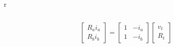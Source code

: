 \documentclass[aspectratio=169]{beamer}
\begin{document}
\begin{frame}[fragile]
\begin{tabular}{r}
\begin{columns}
\begin{column}{0.6\textwidth}
			
				\[ 
			\left[\begin{array}{r}
			R_{a}i_{a} \\
			R_{b}i_{b} \end{array} \right]=
			\left[\begin{array}{rr}
			1 & -i_{a} \\
			1 & -i_{b} \end{array} \right]
			\left[\begin{array}{c}
			v_{t} \\
			R_{t}\end{array} \right] 			
			\]	
			
			
			
			
			
		\end{column}
	
	\end{columns} \\


\end{tabular}
\end{frame}
\end{document}
